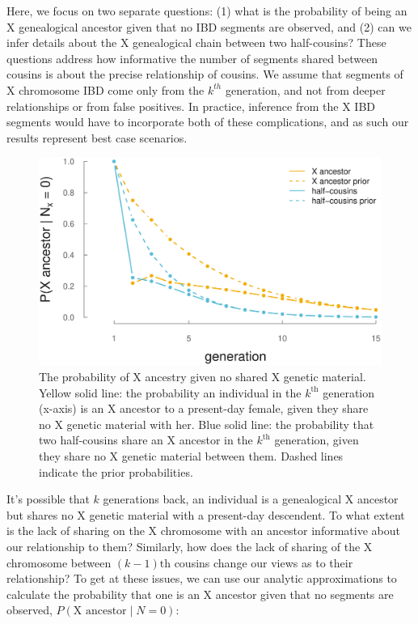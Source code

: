\documentclass[9pt,twocolumn,twoside]{gsajnl}
\begin{document}
Here, we focus on two separate questions: (1) what is the probability of being
an X genealogical ancestor given that no IBD segments are observed, and (2) can
we infer details about the X genealogical chain between two half-cousins?
These questions address how informative the number of segments shared between
cousins is about the precise relationship of cousins. We assume that segments
of X chromosome IBD come only from the $k^{th}$ generation, and not from deeper
relationships or from false positives. In practice, inference from the X IBD
segments would have to incorporate both of these complications, and as such our
results represent best case scenarios.

\begin{figure}[!ht]
  \centering
  \includegraphics[width=\linewidth]{images/prob-xanc-n0.eps}

  \caption{The probability of X ancestry given no shared X genetic material.
Yellow solid line: the probability an individual in the $k^\text{th}$
generation (x-axis) is an X ancestor to a present-day female, given they share
no X genetic material with her. Blue solid line: the probability that two
half-cousins share an X ancestor in the $k^\text{th}$ generation, given they
share no X genetic material between them. Dashed lines indicate the prior
probabilities.}

  \label{fig:prob-xanc-n0}
\end{figure}


It's possible that $k$ generations back, an individual is a genealogical X
ancestor but shares no X genetic material with a present-day descendent. To
what extent is the lack of sharing on the X chromosome with an ancestor
informative about our relationship to them? Similarly, how does the lack of
sharing of the X chromosome between $(k-1)\text{th}$ cousins change our views
as to their relationship?  To get at these issues, we can use our analytic
approximations to calculate the probability that one is an X ancestor given
that no segments are observed, $P(\text{X ancestor} \;|\; N = 0)$:
\end{document}

